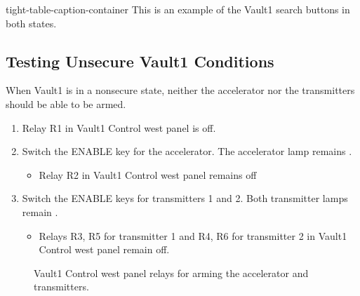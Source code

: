 \documentclass[letterpaper,10pt,english]{sphinxmanual}
\begin{document}
\begin{sphinxuseclass}{tight-table-caption-container}
\sphinxAtStartPar
{} This is an example of the Vault\sphinxhyphen{}1 search buttons in both states.

\end{sphinxuseclass}

\subsection{Testing Unsecure Vault\sphinxhyphen{}1 Conditions}
\label{\detokenize{testing_documentation/Vault-1_ionizing_radiation:testing-unsecure-vault-1-conditions}}
\sphinxAtStartPar
When Vault\sphinxhyphen{}1 is in a non\sphinxhyphen{}secure state, neither the accelerator nor the transmitters should be able to be armed.
\begin{enumerate}
%
\item {} 
\sphinxAtStartPar
Relay R1 in Vault\sphinxhyphen{}1 Control west panel is off.

\item {} 
\sphinxAtStartPar
Switch the ENABLE key for the accelerator.
The accelerator lamp remains .
\begin{itemize}
\item {} 
\sphinxAtStartPar
Relay R2 in Vault\sphinxhyphen{}1 Control west panel remains off

\end{itemize}

\item {} 
\sphinxAtStartPar
Switch the ENABLE keys for transmitters 1 and 2.
Both transmitter lamps remain .
\begin{itemize}
\item {} 
\sphinxAtStartPar
Relays R3, R5 for transmitter 1 and R4, R6 for transmitter 2 in Vault\sphinxhyphen{}1 Control west panel remain off.

\end{itemize}

\end{enumerate}

\begin{figure}[htbp]
\centering
\capstart

\noindent{}
\caption{ Vault\sphinxhyphen{}1 Control west panel relays for arming the accelerator and transmitters.}\label{\detokenize{testing_documentation/Vault-1_ionizing_radiation:id2}}\end{figure}
\end{document}
